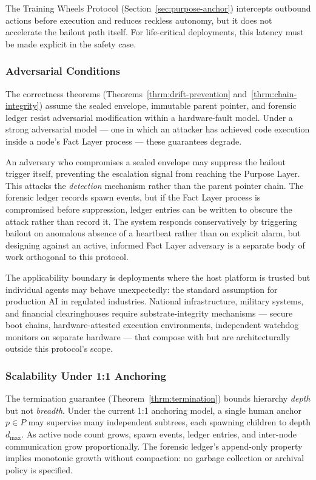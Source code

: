 The Training Wheels Protocol (Section~\ref{sec:purpose-anchor}) intercepts outbound actions before execution and reduces reckless autonomy, but it does not accelerate the bailout path itself. For life-critical deployments, this latency must be made explicit in the safety case.

\subsubsection{Adversarial Conditions}
\label{sec:limitations-adversarial}

The correctness theorems (Theorems~\ref{thrm:drift-prevention} and~\ref{thrm:chain-integrity}) assume the sealed envelope, immutable parent pointer, and forensic ledger resist adversarial modification within a hardware-fault model. Under a strong adversarial model --- one in which an attacker has achieved code execution inside a node's Fact Layer process --- these guarantees degrade.

An adversary who compromises a sealed envelope may suppress the bailout trigger itself, preventing the escalation signal from reaching the Purpose Layer. This attacks the \emph{detection} mechanism rather than the parent pointer chain. The forensic ledger records spawn events, but if the Fact Layer process is compromised before suppression, ledger entries can be written to obscure the attack rather than record it. The system responds conservatively by triggering bailout on anomalous absence of a heartbeat rather than on explicit alarm, but designing against an active, informed Fact Layer adversary is a separate body of work orthogonal to this protocol.

The applicability boundary is deployments where the host platform is trusted but individual agents may behave unexpectedly: the standard assumption for production AI in regulated industries. National infrastructure, military systems, and financial clearinghouses require substrate-integrity mechanisms --- secure boot chains, hardware-attested execution environments, independent watchdog monitors on separate hardware --- that compose with but are architecturally outside this protocol's scope.

\subsubsection{Scalability Under 1:1 Anchoring}
\label{sec:limitations-scalability}

The termination guarantee (Theorem~\ref{thrm:termination}) bounds hierarchy \emph{depth} but not \emph{breadth}. Under the current 1:1 anchoring model, a single human anchor $p \in P$ may supervise many independent subtrees, each spawning children to depth $d_{\max}$. As active node count grows, spawn events, ledger entries, and inter-node communication grow proportionally. The forensic ledger's append-only property implies monotonic growth without compaction: no garbage collection or archival policy is specified.


